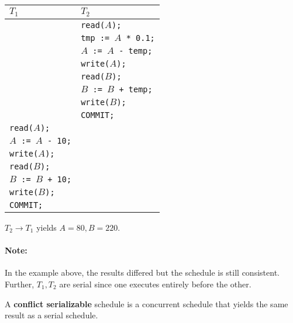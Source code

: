 \documentclass{report}
\newenvironment{definition}[1]{\begin{tcolorbox}[title={Definition: #1}]}{\end{tcolorbox}}
\newenvironment{example}{\begin{tcolorbox}[title={Example},colback=green!5!white,colframe=black!75!green]}{\end{tcolorbox}}
\renewcommand{\bf}[1]{\textbf{{#1}}}
\renewcommand{\tt}[1]{\texttt{{#1}}}
\begin{document}
\begin{example}
    {
        \centering
        \begin{tabular}{l|l}
            $T_1$ & $T_2$ \\
            \hline
                  & \tt{read($A$);} \\
                  & \tt{tmp := $A$ * 0.1;} \\
                  & \tt{$A$ := $A$ - temp;} \\
                  & \tt{write($A$);} \\
                  & \tt{read($B$);} \\
                  & \tt{$B$ := $B$ + temp;} \\
                  & \tt{write($B$);} \\
                  & \tt{COMMIT;} \\
            \tt{read($A$);} & \\
            \tt{$A$ := $A$ - 10;} & \\
            \tt{write($A$);} & \\
            \tt{read($B$);} & \\
            \tt{$B$ := $B$ + 10;} & \\
            \tt{write($B$);} & \\
            \tt{COMMIT;} & \\
        \end{tabular}
        \par
    }
    $T_2 \to T_1$ yields $A = 80, B = 220$.
\end{example}

\paragraph{Note:} In the example above, the results differed but the schedule is
still consistent. Further, $T_1, T_2$ are serial since one executes entirely
before the other.
\begin{definition}{Conflict Serializable}
    A \bf{conflict serializable} schedule is a concurrent schedule that yields
    the same result as a serial schedule.
\end{definition}
\vspace{5em}
\end{document}
